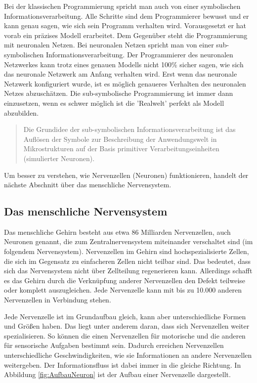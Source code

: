 Bei der klassischen Programmierung spricht man auch von einer symbolischen Informationsverarbeitung. Alle Schritte sind dem Programmierer bewusst und er kann genau sagen, wie sich sein Programm verhalten wird. Vorausgesetzt er hat vorab ein präzises Modell erarbeitet. Dem Gegenüber steht die Programmierung mit neuronalen Netzen. Bei neuronalen Netzen spricht man von einer sub-symbolischen Informationsverarbeitung. Der Programmierer des neuronalen Netzwerkes kann trotz eines genauen Modells nicht 100\% sicher sagen, wie sich das neuronale Netzwerk am Anfang verhalten wird. Erst wenn das neuronale Netzwerk konfiguriert wurde, ist es möglich genaueres Verhalten des neuronalen Netzes abzuschätzen. Die sub-symbolische Programmierung ist immer dann einzusetzen, wenn es schwer möglich ist die 'Realwelt' perfekt als Modell abzubilden. 

\begin{quote}
    Die Grundidee der sub-symbolischen Informationsverarbeitung ist das Auflösen der Symbole zur Beschreibung der Anwendungswelt in Mikrostrukturen auf der Basis primitiver Verarbeitungseinheiten (simulierter Neuronen). \cite[S. 9]{Kratzer1991} 
\end{quote}

Um besser zu verstehen, wie Nervenzellen (Neuronen) funktionieren, handelt der nächste Abschnitt über das menschliche Nervensystem.

\subsection{Das menschliche Nervensystem}
Das menschliche Gehirn besteht aus etwa 86 Milliarden Nervenzellen, auch Neuronen genannt, die zum Zentralnervensystem miteinander verschaltet sind (im folgendem Nervensystem).\cite{dasgehirn.info} Nervenzellen im Gehirn sind hochspezialisierte Zellen, die sich im Gegensatz zu einfacheren Zellen nicht teilbar sind. Das bedeutet, dass sich das Nervensystem nicht über Zellteilung regenerieren kann. Allerdings schafft es das Gehirn durch die Verknüpfung anderer Nervenzellen den Defekt teilweise oder komplett auszugleichen. Jede Nervenzelle kann mit bis zu 10.000 anderen Nervenzellen in Verbindung stehen.\cite{gehirnlernen.de} 

Jede Nervenzelle ist im Grundaufbau gleich, kann aber unterschiedliche Formen und Größen haben. Das liegt unter anderem daran, dass sich Nervenzellen weiter spezialisieren.\cite{gehirnlernen.de} So können die einen Nervenzellen für motorische und die anderen für sensorische Aufgaben bestimmt sein. Dadurch erreichen Nervenzellen unterschiedliche Geschwindigkeiten, wie sie Informationen an andere Nervenzellen weitergeben.\cite{dasgehirn.info} Der Informationsfluss ist dabei immer in die gleiche Richtung.\cite{gehirnlernen.de} In Abbildung \ref{fig:AufbauNeuron} ist der Aufbau einer Nervenzelle dargestellt.

